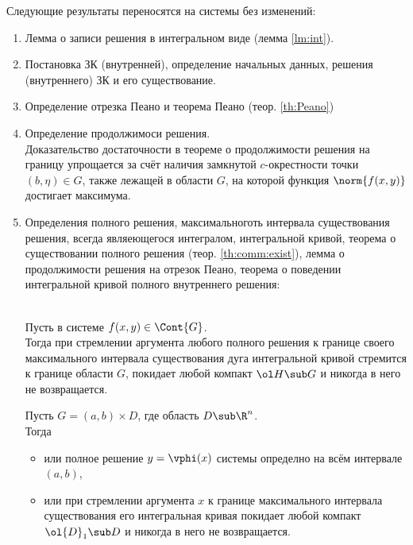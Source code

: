Следующие результаты переносятся на системы без изменений:
\begin{enumerate}
    \item Лемма о записи решения в интегральном виде (лемма \ref{lm:int}).
    \item Постановка ЗК (внутренней), определение начальных данных, решения (внутреннего) ЗК и его существование.
    \item Определение отрезка Пеано и теорема Пеано (теор. \ref{th:Peano})
    \item Определение продолжимоси решения. \\
    Доказательство достаточности в теореме о продолжимости решения на границу упрощается за счёт наличия замкнутой $ c $-окрестности точки $ (b, \eta) \in G $, также лежащей в области $ G $, на которой функция $ \norm{f(x, y)} $ достигает максимума.
    \item Определения полного решения, максимальноготь интервала существования решения, всегда являеющегося интегралом, интегральной кривой, теорема о существовании полного решения (теор. \ref{th:comm:exist}), лемма о продолжимости решения на отрезок Пеано, теорема о поведении интегральной кривой полного внутреннего решения:
    \begin{theorem}
        \hfill \\
        Пусть в системе  $ f(x, y) \in \Cont{G} $. \\
        Тогда при стремлении аргумента любого полного решения к границе своего максимального интервала существования дуга интегральной кривой стремится к границе области $ G $, \ie покидает любой компакт $ \ol H \sub G $ и никогда в него не возвращается.
    \end{theorem}

    \begin{implication}
    	Пусть $ G = (a, b) \times D $, где область $ D \sub \R^n $. \\
        Тогда
        \begin{itemize}
            \item или полное решение $ y = \vphi(x) $ системы  определно на всём интервале $ (a ,b) $,
            \item или при стремлении аргумента $ x $ к границе максимального интервала существования его интегральная кривая покидает любой компакт $ \ol{D}_1 \sub D $ и никогда в него не возвращается.
        \end{itemize}
    \end{implication}


\end{enumerate}
